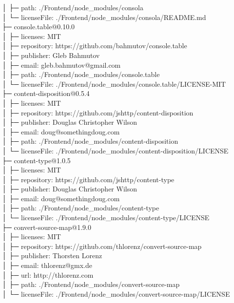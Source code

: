 │  ├─ path: ./Frontend/node\_modules/consola\\
│  └─ licenseFile: ./Frontend/node\_modules/consola/README.md\\
├─ console.table@0.10.0\\
│  ├─ licenses: MIT\\
│  ├─ repository: https://github.com/bahmutov/console.table\\
│  ├─ publisher: Gleb Bahmutov\\
│  ├─ email: gleb.bahmutov@gmail.com\\
│  ├─ path: ./Frontend/node\_modules/console.table\\
│  └─ licenseFile: ./Frontend/node\_modules/console.table/LICENSE-MIT\\
├─ content-disposition@0.5.4\\
│  ├─ licenses: MIT\\
│  ├─ repository: https://github.com/jshttp/content-disposition\\
│  ├─ publisher: Douglas Christopher Wilson\\
│  ├─ email: doug@somethingdoug.com\\
│  ├─ path: ./Frontend/node\_modules/content-disposition\\
│  └─ licenseFile: ./Frontend/node\_modules/content-disposition/LICENSE\\
├─ content-type@1.0.5\\
│  ├─ licenses: MIT\\
│  ├─ repository: https://github.com/jshttp/content-type\\
│  ├─ publisher: Douglas Christopher Wilson\\
│  ├─ email: doug@somethingdoug.com\\
│  ├─ path: ./Frontend/node\_modules/content-type\\
│  └─ licenseFile: ./Frontend/node\_modules/content-type/LICENSE\\
├─ convert-source-map@1.9.0\\
│  ├─ licenses: MIT\\
│  ├─ repository: https://github.com/thlorenz/convert-source-map\\
│  ├─ publisher: Thorsten Lorenz\\
│  ├─ email: thlorenz@gmx.de\\
│  ├─ url: http://thlorenz.com\\
│  ├─ path: ./Frontend/node\_modules/convert-source-map\\
│  └─ licenseFile: ./Frontend/node\_modules/convert-source-map/LICENSE\\
